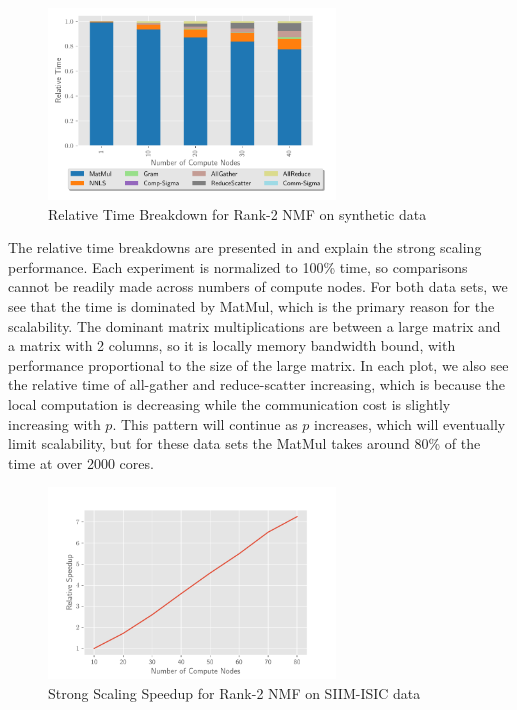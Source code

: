 \documentclass[conference,compsoc]{IEEEtran}
\newcommand{\image}{SIIM-ISIC}
\begin{document}
\begin{figure}
\begin{center}
\includegraphics[height=2in, width=\columnwidth]{plots/synthetic_rank2_strongscaling.pdf}
\caption{Relative Time Breakdown for Rank-2 NMF on synthetic data}
\label{fig:synrank2strongscaling}
\end{center}
\end{figure}

The relative time breakdowns are presented in  and explain the strong scaling performance.
Each experiment is normalized to 100\% time, so comparisons cannot be readily made across numbers of compute nodes. 
For both data sets, we see that the time is dominated by MatMul, which is the primary reason for the scalability.
The dominant matrix multiplications are between a large matrix and a matrix with 2 columns, so it is locally memory bandwidth bound, with performance proportional to the size of the large matrix.
In each plot, we also see the relative time of all-gather and reduce-scatter increasing, which is because the local computation is decreasing while the communication cost is slightly increasing with $p$.
This pattern will continue as $p$ increases, which will eventually limit scalability, but for these data sets the MatMul takes around 80\% of the time at over 2000 cores.

\begin{figure}
\begin{center}
\includegraphics[height=2in, width=\columnwidth]{plots/realworld_rank2_speedup.pdf}
\caption{Strong Scaling Speedup for Rank-2 NMF on \image{} data}
\label{fig:rwrank2speedup}
\end{center}
\end{figure}
\end{document}
